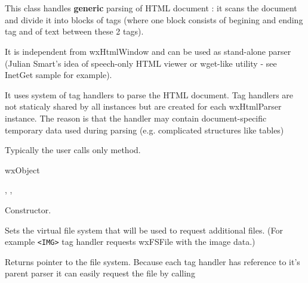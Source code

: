 %
%


\section{}\label{wxhtmlparser}

This class handles {\bf generic} parsing of HTML document : it scans
the document and divide it into blocks of tags (where one block
consists of begining and ending tag and of text between these
2 tags).

It is independent from wxHtmlWindow and can be used as stand-alone parser
(Julian Smart's idea of speech-only HTML viewer or wget-like utility -
see InetGet sample for example). 

It uses system of tag handlers to parse the HTML document. Tag handlers
are not staticaly shared by all instances but are created for each 
wxHtmlParser instance. The reason is that the handler may contain
document-specific temporary data used during parsing (e.g. complicated
structures like tables)

Typically the user calls only  method.


wxObject


,
,



\label{wxhtmlparserwxhtmlparser}


Constructor. 


\label{wxhtmlparsersetfs}


Sets the virtual file system that will be used to request additional
files. (For example {\tt <IMG>} tag handler requests wxFSFile with the
image data.)

\label{wxhtmlparsergetfs}


Returns pointer to the file system. Because each tag handler has
reference to it's parent parser it can easily request the file by
calling

